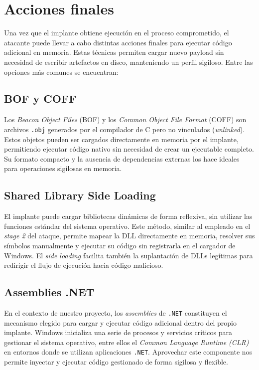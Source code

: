 \section{Acciones finales}
\label{sec:ejecutar-desde-implante}

Una vez que el implante obtiene ejecución en el proceso comprometido, el atacante puede llevar a cabo distintas acciones finales para ejecutar código adicional en memoria. Estas técnicas permiten cargar nuevo payload sin necesidad de escribir artefactos en disco, manteniendo un perfil sigiloso. Entre las opciones más comunes se encuentran:

\subsection{BOF y COFF}
Los \textit{Beacon Object Files} (BOF) y los \textit{Common Object File Format} (COFF) son archivos \texttt{.obj} generados por el compilador de C pero no vinculados (\textit{unlinked}).  
Estos objetos pueden ser cargados directamente en memoria por el implante, permitiendo ejecutar código nativo sin necesidad de crear un ejecutable completo.  
Su formato compacto y la ausencia de dependencias externas los hace ideales para operaciones sigilosas en memoria.

\subsection{Shared Library Side Loading}
El implante puede cargar bibliotecas dinámicas de forma reflexiva, sin utilizar las funciones estándar del sistema operativo.  
Este método, similar al empleado en el \textit{stage 2} del ataque, permite mapear la DLL directamente en memoria, resolver sus símbolos manualmente y ejecutar su código sin registrarla en el cargador de Windows.  
El \textit{side loading} facilita también la suplantación de DLLs legítimas para redirigir el flujo de ejecución hacia código malicioso.

\subsection{Assemblies .NET}

En el contexto de nuestro proyecto, los \textit{assemblies} de \texttt{.NET} constituyen el mecanismo elegido para cargar y ejecutar código adicional dentro del propio implante. Windows inicializa una serie de procesos y servicios críticos para gestionar el sistema operativo, entre ellos el \textit{Common Language Runtime (CLR)} en entornos donde se utilizan aplicaciones \texttt{.NET}. Aprovechar este componente nos permite inyectar y ejecutar código gestionado de forma sigilosa y flexible.

